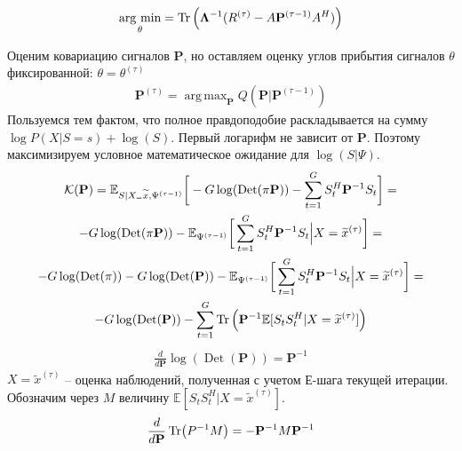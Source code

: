 \documentclass[11pt]{article}
\newcommand{\Expect}{\mathbb{E}}
\DeclareMathOperator*{\argmax}{arg \, \max}
\DeclareMathOperator*{\argmin}{arg \, \min}
\DeclareMathOperator{\Det}{Det}
\begin{document}
\begin{equation}
\argmin_{\theta} = \Tr \Big( \mathbf{\Lambda}^{-1} ({R}^{(\tau)} - A\mathbf{P}^{(\tau-1)}A^H) \Big)
\end{equation}
\begin{center}
\fontsize{14}{18}\selectfont {}
\end{center}
Оценим ковариацию сигналов $\mathbf{P}$, но оставляем оценку углов прибытия сигналов $\theta$ фиксированной: $\theta = \theta^{(\tau)}$
\begin{equation*}
\begin{gathered}
\mathbf{P}^{(\tau)}= \argmax_{\mathbf{P}} Q(\mathbf{P} | \mathbf{P}^{(\tau-1)}) 
\end{gathered}
\end{equation*}
Пользуемся тем фактом, что полное правдоподобие раскладывается на сумму $\log P(X|S=s) + \log(S)$. Первый логарифм не зависит от $\mathbf{P}$. Поэтому максимизируем условное математическое ожидание  для $\log(S| \Psi)$.
\begin{equation*}
\begin{gathered}
\mathcal{K}(\mathbf{P}) = \Expect_{S|X_=\widetilde{x}, \Psi^{(\tau-1)}}\bigg[- G \log(\Det(\pi \mathbf{P})) - \sum_{t=1}^G S_t^H \mathbf{P}^{-1}S_t\bigg] = \\
- G \log(\Det(\pi \mathbf{P})) - \Expect_{\Psi^{(\tau-1)}}\bigg[ \sum_{t=1}^G S_t^H \mathbf{P}^{-1}S_t \Big | X = \widetilde{x}^{(\tau)} \bigg ] = \\
- G \log(\Det(\pi)) - G \log(\Det(\mathbf{P})) - \Expect_{\Psi^{(\tau-1)}}\bigg[ \sum_{t=1}^G S_t^H \mathbf{P}^{-1}S_t \Big | X = \widetilde{x}^{(\tau)} \bigg ] = \\
 - G \log(\Det(\mathbf{P})) - \sum_{t=1}^G \Tr\Big(\mathbf{P}^{-1} \Expect[S_t S_t^H | X = \widetilde{x}^{(\tau)}]\Big)
\end{gathered}
\end{equation*}
\begin{equation*}
\begin{gathered}
\frac{d}{d\mathbf{P}}\log (\Det (\mathbf{P})) = \mathbf{P}^{-1}
\end{gathered}
\end{equation*}
$X = \widetilde{x}^{(\tau)}$ -- оценка наблюдений, полученная с учетом Е-шага текущей итерации.
Обозначим через $M$ величину $\Expect[S_t S_t^H\Big| X = \widetilde{x}^{(\tau)}]$.
\begin{equation*}
\begin{gathered}
\frac{d}{d\mathbf{P}}\Tr(P^{-1}M)= -\mathbf{P}^{-1}M\mathbf{P}^{-1}
\end{gathered}
\end{equation*}
\end{document}

